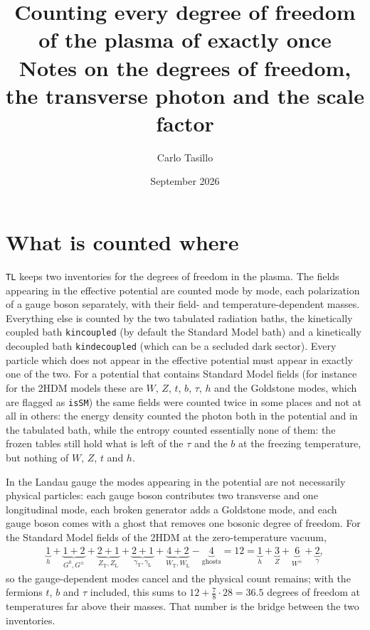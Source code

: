 \documentclass[11pt,a4paper]{article}
\title{\vspace{-1.2cm}Counting every degree of freedom of the plasma of \code{TransitionListener} exactly once\\[0.2em]
\large Notes on the degrees of freedom, the transverse photon and the scale factor}
\date{September 2026}
\author{Carlo Tasillo}
\newcommand{\code}[1]{\texttt{#1}}
\renewcommand{\_}{\oldunderscore\allowbreak}
\begin{document}
\maketitle
\vspace{-1.4cm}

\section{What is counted where}

\code{TL} keeps two inventories for the degrees of freedom in the plasma.
The fields appearing in the effective potential are counted mode by mode, each polarization of
a gauge boson separately, with their field- and temperature-dependent masses. Everything else is counted by the two
tabulated radiation baths, the kinetically coupled bath \code{kin\_coupled\_*}
(by default the Standard Model bath) and
a kinetically decoupled bath \code{kin\_decoupled\_*} (which can be a secluded dark sector).
Every particle which does not appear in the effective potential must appear in
exactly one of the two.
For a potential
that contains Standard Model fields (for instance for the 2HDM models these are $W$, $Z$, $t$, $b$, $\tau$, $h$ and
the Goldstone modes, which are flagged as \code{is\_SM}) the same fields were counted twice in
some places and not at all in others: the energy density counted the photon both in the
potential and in the tabulated bath, while the entropy counted essentially none of them: the
frozen tables still hold what is left of the $\tau$ and the $b$ at the freezing temperature,
but nothing of $W$, $Z$, $t$ and $h$.

In the Landau gauge the modes appearing in the potential are not necessarily physical particles:
each gauge boson
contributes two transverse and one longitudinal mode, each broken generator adds a Goldstone
mode, and each gauge boson comes with a ghost that removes one bosonic degree of freedom. For
the Standard Model fields of the 2HDM at the zero-temperature vacuum,
%
\begin{align}
  \underbrace{1}_{h} + \underbrace{1+2}_{G^0, G^\pm}
  + \underbrace{2+1}_{Z_\text{T}, Z_\text{L}}
  + \underbrace{2+1}_{\gamma_\text{T}, \gamma_\text{L}}
  + \underbrace{4+2}_{W_\text{T}, W_\text{L}}
  - \underbrace{4}_{\text{ghosts}} = 12
  = \underbrace{1}_{h} + \underbrace{3}_{Z} + \underbrace{6}_{W^\pm} + \underbrace{2}_{\gamma} ,
\end{align}
%
so the gauge-dependent modes cancel and the physical count remains; with the fermions $t$, $b$
and $\tau$ included, this sums to $12 + \tfrac{7}{8}\cdot 28 = 36.5$ degrees of freedom at
temperatures far above their masses.
That number is the bridge between the two inventories.
\end{document}
